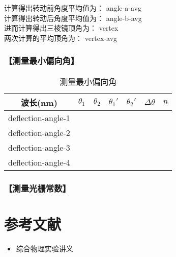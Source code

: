 \documentclass{ctexart}
\let\oldsubsubsection\subsubsection
\renewcommand{\subsubsection}[1]{\oldsubsubsection{\!\!\!\!\!\!【#1】}}
\begin{document}
计算得出转动前角度平均值为：{{ angle-a-avg }} \\
计算得出转动后角度平均值为：{{ angle-b-avg }} \\
进而计算得出三棱镜顶角为：{{ vertex }} \\
两次计算的平均顶角为：{{ vertex-avg }}

\subsubsection{测量最小偏向角}

\begin{table}[H]
  \centering
  \begin{tabular}{|c|c|c|c|c|c|c|}
    \hline
     波长(nm) & $\theta_1$ & $\theta_2$ & $\theta_1'$ & $\theta_2'$ & $\Delta \theta$ & $n$\\\hline
    {{ deflection-angle-1 }}\\\hline
    {{ deflection-angle-2 }}\\\hline
    {{ deflection-angle-3 }}\\\hline
    {{ deflection-angle-4 }}\\\hline
  \end{tabular}
  \caption{测量最小偏向角}
\end{table}


\subsubsection{测量光栅常数}

\section{参考文献}
\begin{itemize}[leftmargin=0pt]
  \item[] 综合物理实验讲义
\end{itemize}
\end{document}
